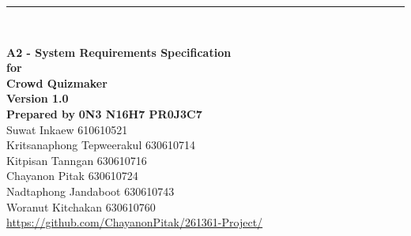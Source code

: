 \documentclass[ 10pt]{report}
\begin{document}
    \begin{titlepage}
        \noindent\rule{\textwidth}{5pt} \\
        \begin{flushright}
            \Huge\textbf{A2 - System Requirements Specification} \\[2\baselineskip]
            \large\textbf{for} \\
            \huge\textbf{Crowd Quizmaker} \\[2\baselineskip]
            \large\textbf{Version 1.0} \\[2\baselineskip]
            \large\textbf{Prepared by} \LARGE\textbf{0N3 N16H7 PR0J3C7} \\[0.5\baselineskip]
            \normalsize{
                Suwat Inkaew 610610521 \\
                Kritsanaphong Tepweerakul 630610714 \\
                Kitpisan Tanngan 630610716 \\
                Chayanon Pitak 630610724 \\
                Nadtaphong Jandaboot 630610743 \\
                Woranut Kitchakan 630610760
            } \\[2\baselineskip]
            \large{\href{https://github.com/ChayanonPitak/261361-Project/}{https://github.com/ChayanonPitak/261361-Project/}}
        \end{flushright}
        \pagebreak


\end{titlepage}
\end{document}
